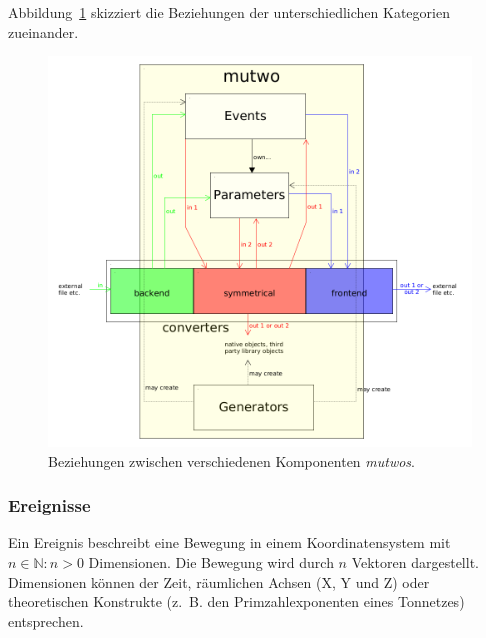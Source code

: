 \documentclass[12pt,a4paper,ngerman]{article}
\begin{document}
\bigskip

Abbildung~\ref{fig:mutwoStructure} skizziert die Beziehungen der unterschiedlichen Kategorien zueinander.

\begin{figure}[H]
    \begin{center}
        \includegraphics[scale=0.38]{pictures/mutwo-structure.png}
    \end{center}
    \caption{%
        Beziehungen zwischen verschiedenen Komponenten \emph{mutwos}.
    }
    \label{fig:mutwoStructure}
\end{figure}



\subsubsection{Ereignisse}
\label{eventDefinitions}

Ein Ereignis beschreibt eine Bewegung in einem Koordinatensystem mit $n\in\mathbb{N}:n>0$ Dimensionen.
Die Bewegung wird durch $n$ Vektoren dargestellt.
Dimensionen können der Zeit, räumlichen Achsen (X, Y und Z) oder theoretischen Konstrukte (z.~B. den Primzahlexponenten eines Tonnetzes) entsprechen.
\end{document}

